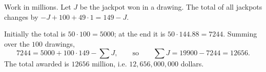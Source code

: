 Work in millions. Let $J$ be the jackpot won in a drawing. The total of all jackpots changes by $-J+100+49\cdot1=149-J$.

Initially the total is $50\cdot100=5000$; at the end it is $50\cdot144.88=7244$. Summing over the $100$ drawings,
\[7244=5000+100\cdot149-\sum J,\qquad\text{so}\qquad \sum J=19900-7244=12656.\]
The total awarded is $12656$ million, i.e. $\boxed{12{,}656{,}000{,}000}$ dollars.
